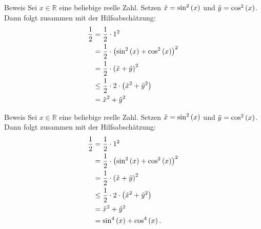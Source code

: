 \documentclass[10pt]{beamer}
\def\bR{\mathbb{R}}
\begin{document}
\begin{frame}{Beweis}
    Sei \( x \in \bR \) eine beliebige reelle Zahl. Setzen \( \Tilde{x} = \sin^{2}\left( x \right) \) und \( \Tilde{y} = \cos^{2}\left( x \right) \). Dann folgt zusammen mit der Hilfsabschätzung:
    \begin{align*}
        \frac{1}{2}
        & = \frac{1}{2} \cdot 1^{2} \\
        & = \frac{1}{2} \cdot \left( \sin^{2}\left( x \right) + \cos^{2}\left( x \right) \right)^{2} \\
        & = \frac{1}{2} \cdot \left( \Tilde{x} + \Tilde{y} \right)^{2} \\
        & \leq \frac{1}{2} \cdot 2 \cdot \left( \Tilde{x}^{2} + \Tilde{y}^{2} \right) \\
        & = \Tilde{x}^{2} + \Tilde{y}^{2}
    \end{align*}
\end{frame}



\begin{frame}{Beweis}
    Sei \( x \in \bR \) eine beliebige reelle Zahl. Setzen \( \Tilde{x} = \sin^{2}\left( x \right) \) und \( \Tilde{y} = \cos^{2}\left( x \right) \). Dann folgt zusammen mit der Hilfsabschätzung:
    \begin{align*}
        \frac{1}{2}
        & = \frac{1}{2} \cdot 1^{2} \\
        & = \frac{1}{2} \cdot \left( \sin^{2}\left( x \right) + \cos^{2}\left( x \right) \right)^{2} \\
        & = \frac{1}{2} \cdot \left( \Tilde{x} + \Tilde{y} \right)^{2} \\
        & \leq \frac{1}{2} \cdot 2 \cdot \left( \Tilde{x}^{2} + \Tilde{y}^{2} \right) \\
        & = \Tilde{x}^{2} + \Tilde{y}^{2} \\
        & = \sin^{4}\left( x \right) + \cos^{4}\left( x \right).
    \end{align*}
\end{frame}
\end{document}
